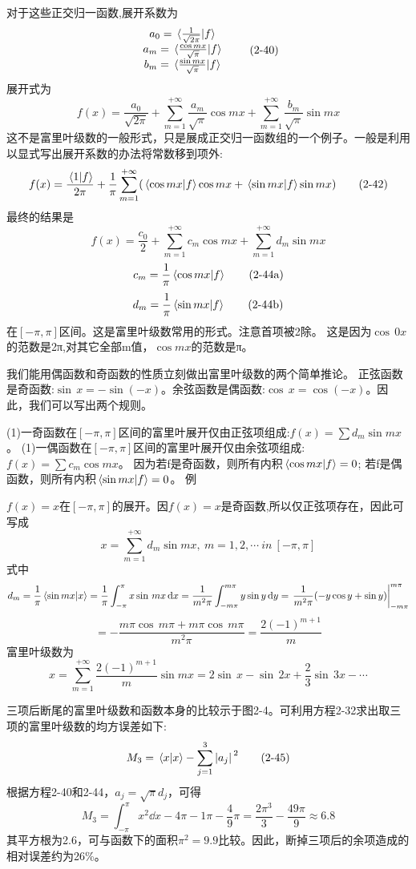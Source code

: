 对于这些正交归一函数,展开系数为
\[
\begin{array}{c}
    a_0=\bra*{\frac{1}{\sqrt{2\pi}}}\ket*{f} \\
    a_m=\bra*{\frac{\cos mx}{\sqrt{\pi}}}\ket*{f} \\
    b_m=\bra*{\frac{\sin mx}{\sqrt{\pi}}}\ket*{f}
\end{array}    
\tag{2-40}
\]
展开式为
\[f(x)=\frac{a_0}{\sqrt{2\pi}}+\sum_{m=1}^{+\infty}\frac{a_m}{\sqrt{\pi}}\cos mx+\sum_{m=1}^{+\infty}\frac{b_m}{\sqrt{\pi}}\sin mx \tag{2-41}\]
这不是富里叶级数的一般形式，只是展成正交归一函数组的一个例子。一般是利用以显式写出展开系数的办法将常数移到项外:
\[f(x)=\frac{\bra*{1}\ket*{f}}{2\pi}+\frac{1}{\pi}\sum_{m=1}^{+\infty}(\bra*{\cos mx}\ket*{f}\cos mx+\bra*{\sin mx}\ket*{f}\sin mx) \tag{2-42}\]
最终的结果是
\[f(x)=\frac{c_0}{2}+\sum_{m=1}^{+\infty}c_m\cos mx+\sum_{m=1}^{+\infty}d_m\sin mx \tag{2-43}\]
\[c_m=\frac{1}{\pi}\bra*{\cos mx}\ket*{f} \tag{2-44a}\]
\[d_m=\frac{1}{\pi}\bra*{\sin mx}\ket*{f} \tag{2-44b}\]
在$[-\pi,\pi]$区间。这是富里叶级数常用的形式。注意首项被2除。
这是因为$\cos  \, 0x$的范数是2π,对其它全部m值，$\cos mx$的范数是π。

我们能用偶函数和奇函数的性质立刻做出富里叶级数的两个简单推论。
正弦函数是奇函数:$\sin\, x=-\sin(-x)$。余弦函数是偶函数:$\cos  \, x=\cos (-x)$。因此，我们可以写出两个规则。

(1)一奇函数在$[-\pi,\pi]$区间的富里叶展开仅由正弦项组成:$f(x)=\sum d_m\sin mx$。
(1)一偶函数在$[-\pi,\pi]$区间的富里叶展开仅由余弦项组成:$f(x)=\sum c_m\cos mx$。
因为若f是奇函数，则所有内积$\bra*{\cos mx}\ket*{f}=0$;
若f是偶函数，则所有内积$\bra*{\sin mx}\ket*{f}=0$。
例

$f(x)=x$在$[-\pi,\pi]$的展开。因$f(x)=x$是奇函数,所以仅正弦项存在，因此可写成
\[x=\sum_{m=1}^{+\infty}d_m\sin mx, \ m=1,2, \cdots \ in \ [-\pi,\pi]\]
式中
\[d_m=\frac{1}{\pi}\bra*{\sin mx}\ket*{x}=\frac{1}{\pi}\int_{-\pi}^{\pi}x\sin \,mx\dd{x}=\frac{1}{m^2\pi}\int_{-m\pi}^{m\pi}y\sin y\dd{y}=\eval{\frac{1}{m^2\pi}(-y\cos y+\sin y)}_{-m\pi}^{m\pi}\]
\[=-\frac{m\pi \cos  \, m\pi+m\pi \cos  \,m\pi}{m^2\pi}=\frac{2(-1)^{m+1}}{m}\]
富里叶级数为
\[x=\sum_{m=1}^{+\infty}\frac{2(-1)^{m+1}}{m}\sin mx=2\sin \, x-\sin \, 2x +\frac{2}{3}\sin \, 3x -\cdots\]

三项后断尾的富里叶级数和函数本身的比较示于图2-4。可利用方程2-32求出取三项的富里叶级数的均方误差如下:
\[M_3=\bra*{x}\ket*{x}-\sum_{j=1}^3\abs*{a_j}^2 \tag{2-45}\]
根据方程2-40和2-44，$a_j=\sqrt{\pi}d_j$，可得
\[M_3=\int_{-\pi}^{\pi}x^2\dd{x}-4\pi-1\pi-\frac{4}{9}\pi=\frac{2\pi^3}{3}-\frac{49\pi}{9} \approx 6.8\]
其平方根为2.6，可与函数下的面积$\pi^2=9.9$比较。因此，断掉三项后的余项造成的相对误差约为26\%。

